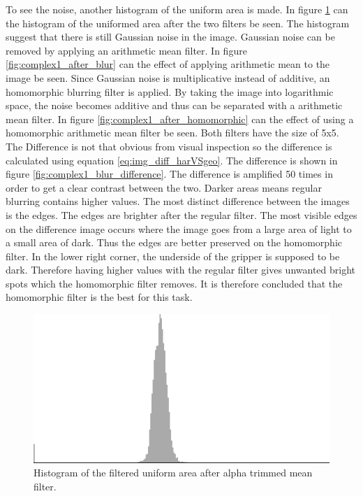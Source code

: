 To see the noise, another histogram of the uniform area is made.
In figure \ref{fig:hist_img1_after_alpha} can the histogram of the uniformed area after the two filters be seen.
The histogram suggest that there is still Gaussian noise in the image.
Gaussian noise can be removed by applying an arithmetic mean filter.
In figure \ref{fig:complex1_after_blur} can the effect of applying arithmetic mean to the image be seen.
Since Gaussian noise is multiplicative instead of additive, an homomorphic blurring filter is applied.
By taking the image into logarithmic space, the noise becomes additive and thus can be separated with a arithmetic mean filter.
In figure \ref{fig:complex1_after_homomorphic} can the effect of using a homomorphic arithmetic mean filter be seen.
Both filters have the size of 5x5. The Difference is not that obvious from visual inspection so the difference is calculated using equation \ref{eq:img_diff_harVSgeo}.
The difference is shown in figure \ref{fig:complex1_blur_difference}.
The difference is amplified 50 times in order to get a clear contrast between the two.
Darker areas means regular blurring contains higher values.
The most distinct difference between the images is the edges. 
The edges are brighter after the regular filter. 
The most visible edges on the difference image occurs where the image goes from a large area of light to a small area of dark.
Thus the edges are better preserved on the homomorphic filter.
In the lower right corner, the underside of the gripper is supposed to be dark.
Therefore having higher values with the regular filter gives unwanted bright spots which the homomorphic filter removes.
It is therefore concluded that the homomorphic filter is the best for this task.


\begin{figure}[H]
\centering
\includegraphics[width = \histogramWidth]{graphics/hist1_uniform2.png}
\caption{Histogram of the filtered uniform area after alpha trimmed mean filter.}
\label{fig:hist_img1_after_alpha}
\end{figure}

